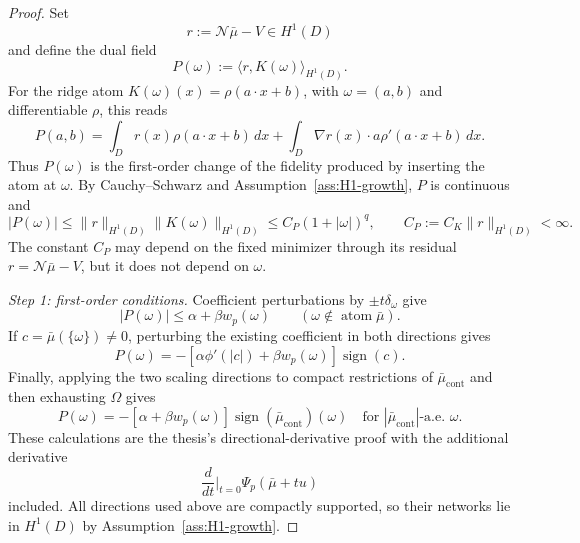 \documentclass[11pt]{amsart}
\theoremstyle{definition}
\theoremstyle{remark}
\DeclareMathOperator{\sign}{sign}
\DeclareMathOperator{\atom}{atom}
\DeclareMathOperator{\cont}{cont}
\newcommand{\N}{\mathcal{N}}
\begin{document}
\begin{proof}
Set
\[
  r:=\N\bar\mu-V\in H^1(D)
\]
and define the dual field
\[
  P(\omega)
  :=
  \langle r,K(\omega)\rangle_{H^1(D)}.
\]
For the ridge atom $K(\omega)(x)=\rho(a\cdot x+b)$, with
$\omega=(a,b)$ and differentiable $\rho$, this reads
\[
  P(a,b)
  =
  \int_D r(x)\rho(a\cdot x+b)\,dx
  +
  \int_D \nabla r(x)\cdot a\rho'(a\cdot x+b)\,dx.
\]
Thus $P(\omega)$ is the first-order change of the fidelity produced by
inserting the atom at $\omega$.  By Cauchy--Schwarz and
Assumption~\ref{ass:H1-growth}, $P$ is continuous and
\begin{equation}
  \label{eq:P-growth}
  |P(\omega)|
  \leq
  \|r\|_{H^1(D)}\|K(\omega)\|_{H^1(D)}
  \leq
  C_P(1+|\omega|)^q,
  \qquad
  C_P:=C_K\|r\|_{H^1(D)}<\infty.
\end{equation}
The constant $C_P$ may depend on the fixed minimizer through its residual
$r=\N\bar\mu-V$, but it does not depend on $\omega$.

\medskip
\noindent
\emph{Step 1: first-order conditions.}
Coefficient perturbations by $\pm t\delta_\omega$ give
\begin{equation}
  \label{eq:weighted-insertion}
  |P(\omega)|
  \leq
  \alpha+\beta w_p(\omega)
  \qquad(\omega\notin\atom\bar\mu).
\end{equation}
If $c=\bar\mu(\{\omega\})\neq0$, perturbing the existing coefficient in both
directions gives
\begin{equation}
  \label{eq:weighted-atom-condition}
  P(\omega)
  =
  -\left[
    \alpha\phi'(|c|)+\beta w_p(\omega)
  \right]\sign(c).
\end{equation}
Finally, applying the two scaling directions to compact restrictions of
$\bar\mu_{\cont}$ and then exhausting $\Omega$ gives
\begin{equation}
  \label{eq:weighted-cont-condition}
  P(\omega)
  =
  -\left[\alpha+\beta w_p(\omega)\right]
  \sign(\bar\mu_{\cont})(\omega)
  \quad\text{for }|\bar\mu_{\cont}|\text{-a.e. }\omega.
\end{equation}
These calculations are the thesis's directional-derivative proof with the
additional derivative
\[
  \frac{d}{dt}\bigg|_{t=0}
  \Psi_p(\bar\mu+t u)
\]
included.  All directions used above are compactly supported, so their
networks lie in $H^1(D)$ by Assumption~\ref{ass:H1-growth}.


\end{proof}
\end{document}
